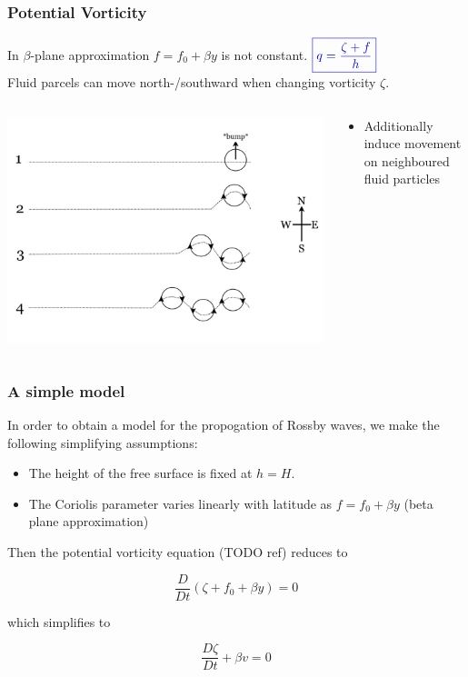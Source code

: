 \documentclass[12pt]{beamer}
\begin{document}
\begin{frame}
\frametitle{Potential Vorticity}
In $\beta$-plane approximation $f=f_0+\beta y$ is not constant. \hfill $\color{blue}\boxed{q=\frac{\zeta+f}{h}}$\\
\vspace{0.5cm}
Fluid parcels can move north-/southward when changing vorticity $\zeta$.
\begin{columns}
\begin{column}{0.55\textwidth}
\includegraphics[width=\linewidth]{beta_plane}
\end{column}
\begin{column}{0.45\textwidth}
\begin{itemize}
	\item Additionally induce movement on neighboured fluid particles
\end{itemize}
\end{column}
\end{columns}
\end{frame}

\begin{frame}[fragile]
\frametitle{A simple model}

In order to obtain a model for the propogation of Rossby waves, we make the following simplifying assumptions:

 \begin{itemize}
\item The height of the free surface is fixed at $h=H$.
\item The Coriolis parameter varies linearly with latitude as $f=f_0+\beta y$ (beta plane approximation)
\end{itemize}

Then the potential vorticity equation (TODO ref) reduces to

\[
\frac{D}{Dt}\left(\zeta+f_0+\beta y\right)=0
\]

which simplifies to

\[
\frac{D\zeta}{Dt}+\beta v=0
\]
\end{frame}
\end{document}
